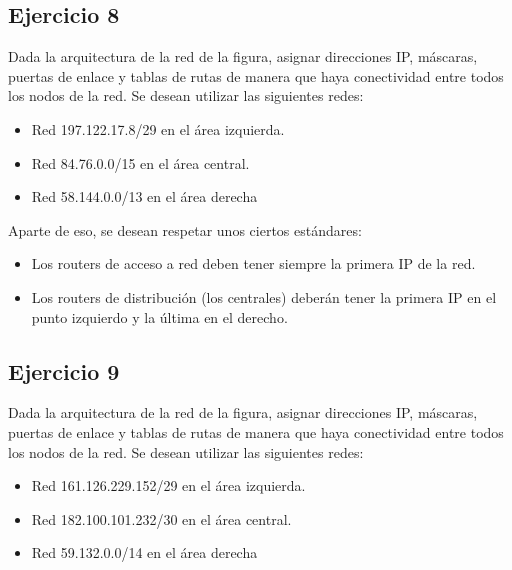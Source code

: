 \documentclass[letterpaper,10pt,spanish]{sphinxmanual}
\begin{document}
\subsection{Ejercicio 8}
\label{\detokenize{t2_integracion_elementos/ejercicios_subredes_ipv4/ejercicios_dos_router:ejercicio-8}}
\sphinxAtStartPar
Dada la arquitectura de la red de la figura, asignar direcciones IP, máscaras, puertas de enlace y tablas de rutas de manera que haya conectividad entre todos
los nodos de la red. Se desean utilizar las siguientes redes:
\begin{itemize}
\item {} 
\sphinxAtStartPar
Red 197.122.17.8/29 en el área izquierda.

\item {} 
\sphinxAtStartPar
Red 84.76.0.0/15 en el área central.

\item {} 
\sphinxAtStartPar
Red 58.144.0.0/13 en el área derecha

\end{itemize}

\begin{figure}[htbp]
\centering

\noindent{}
\end{figure}

\sphinxAtStartPar
Aparte de eso, se desean respetar unos ciertos estándares:
\begin{itemize}
\item {} 
\sphinxAtStartPar
Los routers de acceso a red deben tener siempre la primera IP de la red.

\item {} 
\sphinxAtStartPar
Los routers de distribución (los centrales) deberán tener la primera IP en el punto izquierdo y la última en el derecho.

\end{itemize}


\subsection{Ejercicio 9}
\label{\detokenize{t2_integracion_elementos/ejercicios_subredes_ipv4/ejercicios_dos_router:ejercicio-9}}
\sphinxAtStartPar
Dada la arquitectura de la red de la figura, asignar direcciones IP, máscaras, puertas de enlace y tablas de rutas de manera que haya conectividad entre todos
los nodos de la red. Se desean utilizar las siguientes redes:
\begin{itemize}
\item {} 
\sphinxAtStartPar
Red 161.126.229.152/29 en el área izquierda.

\item {} 
\sphinxAtStartPar
Red 182.100.101.232/30 en el área central.

\item {} 
\sphinxAtStartPar
Red 59.132.0.0/14 en el área derecha

\end{itemize}
\end{document}
